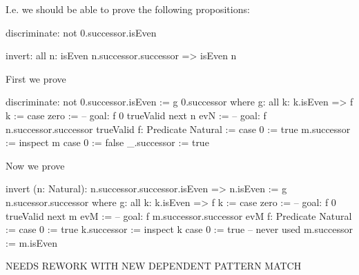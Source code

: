 I.e. we should be able to prove the following propositions:

\begin{alba}
    discriminate: not 0.successor.isEven

    invert: all n: isEven n.successor.successor => isEven n
\end{alba}


\noindent First we prove 
%
\begin{alba}
    discriminate: not 0.successor.isEven
    :=
        g 0.successor
        where
            g: all k: k.isEven => f k :=
                case
                    zero :=
                        -- goal: f 0
                        trueValid
                    next n evN :=
                        -- goal: f n.successor.successor
                        trueValid
            f: Predicate Natural :=
                case
                    0 :=
                        true
                    m.successor :=
                        inspect m case
                            0 :=
                                false
                            _.successor :=
                                true
\end{alba}




\noindent Now we prove 
%
\begin{alba}
    invert (n: Natural): n.successor.successor.isEven => n.isEven
    :=
        g n.sucessor.successor
        where
            g: all k: k.isEven => f k :=
                case
                    zero :=
                        -- goal: f 0
                        trueValid
                    next m evM :=
                        -- goal: f m.successor.successor
                        evM
            f: Predicate Natural :=
                case
                    0 :=
                        true
                    k.successor :=
                        inspect k case
                            0 :=
                                true -- never used
                            m.successor :=
                                m.isEven
\end{alba}








\noindent NEEDS REWORK WITH NEW DEPENDENT PATTERN MATCH

